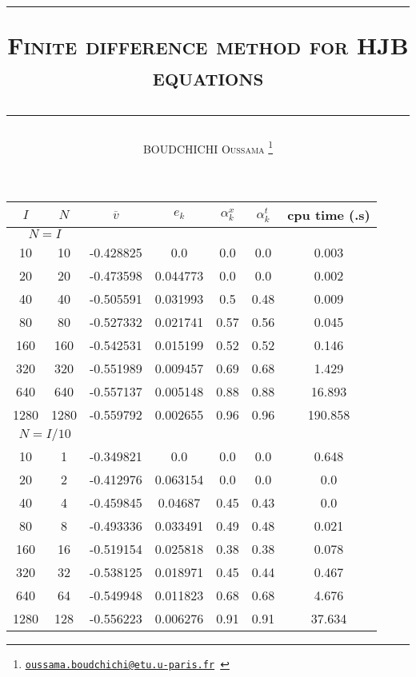 \documentclass[a4paper,12pt, openright]{article}
\numberwithin{equation}{section}
\theoremstyle{definition}
\newcommand{\1}{\mathbbm{1}}
\begin{document}


\title{
\textcolor{pc}{\hrule height 2pt}
\vspace*{0.4cm}

\Huge\textsc{Finite difference method for HJB equations}

\vspace*{0.2cm} \textcolor{pc}{\hrule height 2pt} }
\author{\textsc{BOUDCHICHI Oussama \thanks{\textcolor{midnightblue}{\texttt{\href{mailto:oussama.boudchichi@etu.u-paris.fr}{\underline{oussama.boudchichi@etu.u-paris.fr}} }}}}}
\date{}
\maketitle



\begin{center}
        \begin{tabular}{|| c | c | c | c | c | c | c||}
        \hline 
        $I$ & $N$ & $\overline{v}$ & $e_k$ & $\alpha_k^x$ &  $\alpha_k^t$& cpu time (.s)\\
        \hline \hline
        \multicolumn{2}{||c|}{$N = I$} &  \multicolumn{5}{|c||}{\cellcolor{midnightblue}}\\
        \hline
        10	&10	&-0.428825	&0.0	&0.0	&0.0	&0.003\\	
        20	&20	&-0.473598	&0.044773	&0.0	&0.0	&0.002\\	
        40	&40	&-0.505591	&0.031993	&0.5	&0.48	&0.009	\\
        80	&80	&-0.527332	&0.021741	&0.57	&0.56	&0.045	\\
        160	&160	&-0.542531	&0.015199	&0.52	&0.52 &0.146	\\
        320	&320	&-0.551989	&0.009457	&0.69	&0.68	&1.429	\\
        640	&640	&-0.557137	&0.005148	&0.88	&0.88	&16.893	\\
        1280	&1280	&-0.559792	&0.002655	&\textcolor{specCol}{0.96}	&\textcolor{specCol}{0.96}	&190.858	\\
        \hline \hline
        \multicolumn{2}{||c|}{$N = I / 10$} &  \multicolumn{5}{|c||}{\cellcolor{midnightblue}}\\
        \hline
        10	&1	&-0.349821	&0.0	&0.0	&0.0	&0.648\\	
        20	&2	&-0.412976	&0.063154	&0.0	&0.0	&0.0\\	
        40	&4	&-0.459845	&0.04687	&0.45	&0.43	&0.0\\	
        80	&8	&-0.493336	&0.033491	&0.49	&0.48	&0.021\\	
        160	&16	&-0.519154 &0.025818	&0.38	&0.38	&0.078\\	
        320	&32	&-0.538125	&0.018971	&0.45	&0.44	&0.467\\	
        640	&64	&-0.549948	&0.011823	&0.68	&0.68	&4.676\\	
        1280	&128	&-0.556223	&0.006276	&\textcolor{specCol}{0.91}	&\textcolor{specCol}{0.91}	&37.634	\\
        \hline 
        \end{tabular}
    \label{tab4}
    \end{center}
    
\end{document}

